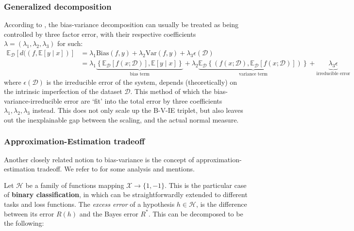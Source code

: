 \documentclass[10pt]{article} %
\begin{document}
\subsubsection{Generalized decomposition}

According to \cite{domingos_unified_aaai_2000,domingos_unified_2000}, the bias-variance decomposition can usually be treated as being controlled by three factor error, with their respective coefficients $\lambda=(\lambda_{1},\lambda_{2},\lambda_{3})$ for such: 
    \noindent 
    \begin{equation*}
        \begin{split}
            \mathbb{E}_{\mathcal{D}} \left[d((f,\mathbb{E}[y\mid x])\right] & = \lambda_{1} \mathrm{Bias}(f,y) + \lambda_{2}\mathrm{Var}(f,y)+ \lambda_{3}\epsilon(\mathcal{D})\\ 
            & = \lambda_{1}\underbrace{\left\{ \mathbb{E}_{\mathcal{D}}[f(x;\mathcal{D})] , \mathbb{E}[y\mid x] \right\}}_{\text{bias term}} +\lambda_{2} \underbrace{\mathbb{E}_{\mathcal{D}} \left\{(f(x;\mathcal{D}), \mathbb{E}_{\mathcal{D}}[f(x;\mathcal{D})])\right\}}_{\text{variance term}} +\underbrace{\lambda_{3}\epsilon}_{\text{irreducible error}}
        \end{split}
        \end{equation*}
where $\epsilon(\mathcal{D})$ is the irreducible error of the system, depends (theoretically) on the intrinsic imperfection of the dataset $\mathcal{D}$. This method of which the bias-variance-irreducible error are `fit' into the total error by three coefficients $\lambda_{1},\lambda_{2},\lambda_{3}$ instead. This does not only scale up the B-V-IE triplet, but also leaves out the inexplainable gap between the scaling, and the actual normal measure. 

\subsubsection{Approximation-Estimation tradeoff}

Another closely related notion to bias-variance is the concept of approximation-estimation tradeoff. We refer to \cite{10.5555/2371238,lafon_understanding_2024} for some analysis and mentions. 

Let $\mathcal{H}$ be a family of functions mapping $\mathcal{X}\to\{1,-1\}$. This is the particular case of \textbf{binary classification}, in which can be straightforwardly extended to different tasks and loss functions. The \textit{excess error} of a hypothesis $h\in\mathcal{H}$, is the difference between its error $R(h)$ and the Bayes error $R^{*}$. This can be decomposed to be the following: 
\end{document}
